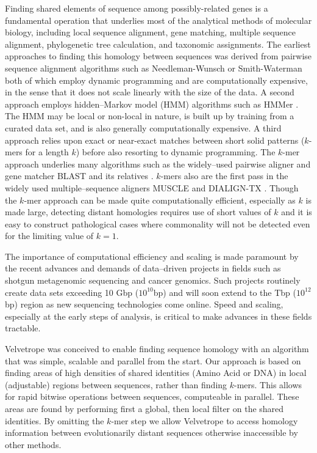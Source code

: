 \documentclass[phd,tocprelim]{cornell}
\begin{document}
Finding shared elements of sequence among possibly-related genes is a
fundamental operation that underlies most of the analytical methods of
molecular biology, including local sequence alignment, gene matching,
multiple sequence alignment, phylogenetic tree calculation, and
taxonomic assignments. The earliest approaches to finding this homology
between sequences was derived from pairwise sequence alignment algorithms
such as Needleman-Wunsch \cite{Needleman70} or Smith-Waterman
\cite{SmithWaterman} both of which employ dynamic programming and
are computationally expensive, in the sense that it does not scale linearly with the size of the data. A second approach employs
hidden--Markov model (HMM) algorithms such as HMMer
\cite{Eddy98}. The HMM may be local or non-local in nature, is
built up by training from a curated data set, and is also generally
computationally expensive. A third approach relies upon exact or
near-exact matches between short solid patterns ($k$-mers for a length $k$) before also resorting to dynamic programming.  The
$k$-mer approach underlies many algorithms such as the widely--used
pairwise aligner and gene matcher BLAST \cite{BLAST} and its
relatives \cite{BLAT,Megablast,PSIBLAST}. $k$-mers also are the first pass in the widely used multiple--sequence aligners
MUSCLE \cite{MUSCLE} and DIALIGN-TX \cite{DIALIGN-TX}. Though the $k$-mer approach can be made quite computationally
efficient, especially as $k$ is made large, detecting distant
homologies requires use of short values of $k$ and it is easy to
construct pathological cases where commonality will not be detected
even for the limiting value of $k = 1$.

The importance of computational efficiency and scaling is made paramount by the recent advances
and demands of data--driven projects in fields such as
shotgun metagenomic sequencing and cancer genomics. Such projects
routinely create data sets exceeding 10 Gbp ($10^{10}$bp) and will soon extend
to the Tbp ($10^{12}$bp) region as new sequencing technologies come online. Speed
and scaling, especially at the early steps of analysis, is critical to make advances in these fields tractable.

Velvetrope was conceived to enable finding sequence homology with an algorithm that
was simple, scalable and parallel from the start. Our approach is based on finding areas of high densities of shared identities (Amino Acid or DNA) in local
(adjustable) regions between sequences, rather than finding $k$-mers. This allows for rapid bitwise operations between sequences, computeable in parallel. These areas are found by performing first a global, then local filter on the shared identities. By omitting the $k$-mer step we allow Velvetrope to access homology information between evolutionarily distant sequences otherwise inaccessible by other methods.
\end{document}

